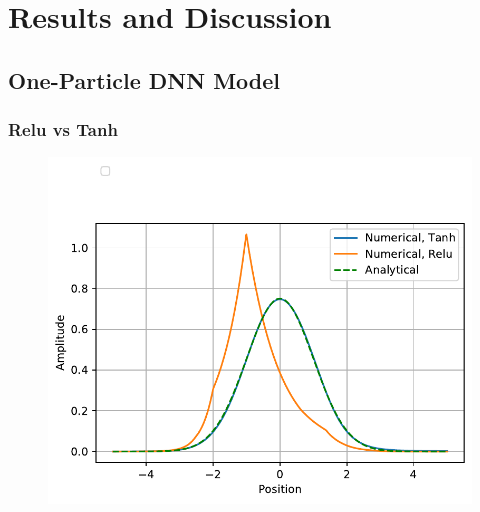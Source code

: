 \section{Results and Discussion}\label{sec:Discussion}

\subsection{One-Particle DNN Model}
\subsubsection{Relu vs Tanh}

\begin{figure}[H]
	\includegraphics[scale=0.6]{figures/one_part_wavefunc.pdf}
	\caption{}
	\label{}
\end{figure}


\subsection{}



